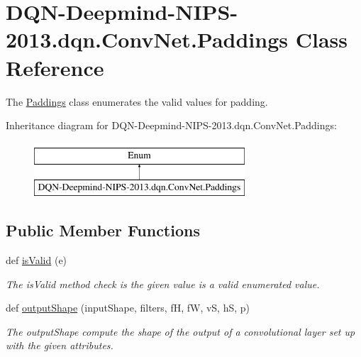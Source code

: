 \hypertarget{classDQN-Deepmind-NIPS-2013_1_1dqn_1_1ConvNet_1_1Paddings}{}\section{D\+Q\+N-\/\+Deepmind-\/\+N\+I\+P\+S-\/2013.dqn.\+Conv\+Net.\+Paddings Class Reference}
\label{classDQN-Deepmind-NIPS-2013_1_1dqn_1_1ConvNet_1_1Paddings}


The \hyperlink{classDQN-Deepmind-NIPS-2013_1_1dqn_1_1ConvNet_1_1Paddings}{Paddings} class enumerates the valid values for padding.  


Inheritance diagram for D\+Q\+N-\/\+Deepmind-\/\+N\+I\+P\+S-\/2013.dqn.\+Conv\+Net.\+Paddings\+:\begin{figure}[H]
\begin{center}
\leavevmode
\includegraphics[height=2.000000cm]{classDQN-Deepmind-NIPS-2013_1_1dqn_1_1ConvNet_1_1Paddings}
\end{center}
\end{figure}
\subsection*{Public Member Functions}
\begin{DoxyCompactItemize}
\item 
def \hyperlink{classDQN-Deepmind-NIPS-2013_1_1dqn_1_1ConvNet_1_1Paddings_a0d529b649569466ae860a5d9f0556f79}{is\+Valid} (e)
\begin{DoxyCompactList}\small\item\em The is\+Valid method check is the given value is a valid enumerated value. \end{DoxyCompactList}\item 
def \hyperlink{classDQN-Deepmind-NIPS-2013_1_1dqn_1_1ConvNet_1_1Paddings_a06c639bace15b03e0e397b090c989ba6}{output\+Shape} (input\+Shape, filters, fH, fW, vS, hS, p)
\begin{DoxyCompactList}\small\item\em The output\+Shape compute the shape of the output of a convolutional layer set up with the given attributes. \end{DoxyCompactList}\end{DoxyCompactItemize}
